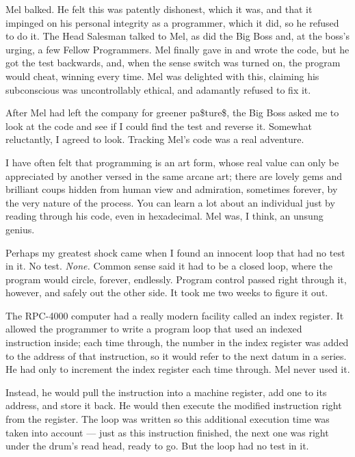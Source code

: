 \documentclass[12pt]{article}
\begin{document}
\bigskip
\noindent
Mel balked.
He felt this was patently dishonest,
which it was,
and that it impinged on his personal integrity as a programmer,
which it did,
so he refused to do it.
The Head Salesman talked to Mel,
as did the Big Boss and, at the boss's urging,
a few Fellow Programmers.
Mel finally gave in and wrote the code,
but he got the test backwards,
and, when the sense switch was turned on,
the program would cheat, winning every time.
Mel was delighted with this,
claiming his subconscious was uncontrollably ethical,
and adamantly refused to fix it.

\bigskip
\noindent
After Mel had left the company for greener pa\$ture\$,
the Big Boss asked me to look at the code
and see if I could find the test and reverse it.
Somewhat reluctantly, I agreed to look.
Tracking Mel's code was a real adventure.

\bigskip
\noindent
I have often felt that programming is an art form,
whose real value can only be appreciated
by another versed in the same arcane art;
there are lovely gems and brilliant coups
hidden from human view and admiration, sometimes forever,
by the very nature of the process.
You can learn a lot about an individual
just by reading through his code,
even in hexadecimal.
Mel was, I think, an unsung genius.

\bigskip
\noindent
Perhaps my greatest shock came
when I found an innocent loop that had no test in it.
No test.  {\it None.}
Common sense said it had to be a closed loop,
where the program would circle, forever, endlessly.
Program control passed right through it, however,
and safely out the other side.
It took me two weeks to figure it out.

\bigskip
\noindent
The RPC-4000 computer had a really modern facility
called an index register.
It allowed the programmer to write a program loop
that used an indexed instruction inside;
each time through,
the number in the index register
was added to the address of that instruction,
so it would refer
to the next datum in a series.
He had only to increment the index register
each time through.
Mel never used it.

\bigskip
\noindent
Instead, he would pull the instruction into a machine register,
add one to its address,
and store it back.
He would then execute the modified instruction
right from the register.
The loop was written so this additional execution time
was taken into account ---
just as this instruction finished,
the next one was right under the drum's read head,
ready to go.
But the loop had no test in it.
\end{document}
